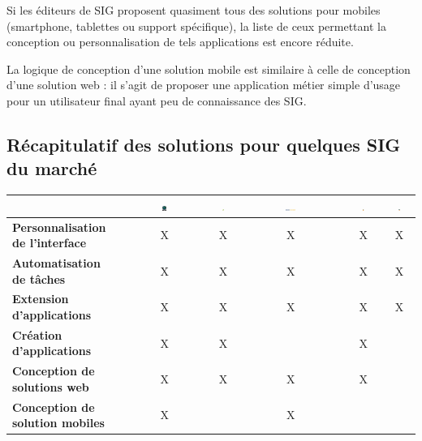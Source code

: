 \documentclass[11pt]{article}
\begin{document}
Si les éditeurs de SIG proposent quasiment tous des solutions pour mobiles (smartphone, tablettes ou support spécifique), la liste de ceux permettant la conception ou personnalisation de tels applications est encore réduite.

La logique de conception d'une solution mobile est similaire à celle de conception d'une solution web : il s'agit de proposer une application métier simple d'usage pour un utilisateur final ayant peu de connaissance des SIG. 

\subsection{Récapitulatif des solutions pour quelques SIG du marché}

\begin{tabular}{|l|c|c|c|c|c|}
	\hline
	 & \includegraphics[width=0.05\textwidth]{img/cours/logo_esri.jpg} & \includegraphics[width=0.06\textwidth]{img/cours/logo_qgis.jpeg} & \includegraphics[width=0.1\textwidth]{img/cours/logo_geoconcept.jpg} & \includegraphics[width=0.06\textwidth]{img/cours/logo_mapinfo.jpg} & \includegraphics[width=0.06\textwidth]{img/cours/logo_openjump.jpeg} \\
	\hline
	\textbf{Personnalisation de l'interface} & X & X & X & X & X \\
	\hline
	\textbf{Automatisation de tâches} & X & X & X & X & X \\
	\hline
	\textbf{Extension d'applications} & X & X & X & X & X \\
	\hline
	\textbf{Création d'applications} & X & X &  & X &  \\
	\hline
	\textbf{Conception de solutions web} & X & X & X & X &  \\
	\hline
	\textbf{Conception de solution mobiles} & X &  & X &  &  \\
	\hline
\end{tabular}
\end{document}
